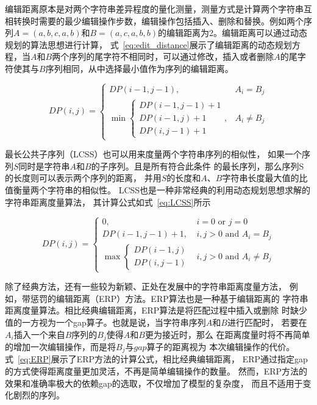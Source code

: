 编辑距离原本是对两个字符串差异程度的量化测量，测量方式是计算两个字符串互相转换时需要的最少编辑操作步数，编辑操作包括插入、删除和替换。例如两个序列$A=\left(a,b,c,a,b\right)$和$B=\left(a,c,a,b,b\right)$的编辑距离为2。编辑距离可以通过动态规划的算法思想进行计算，
式~\ref{eq:edit_distance}展示了编辑距离的动态规划方程，当$A$和$B$两个序列的尾字符不相同时，可以通过修改，插入或者删除$A$的尾字符使其与$B$序列相同，从中选择最小值作为序列的编辑距离。


\begin{equation}
  DP(i, j)= \begin{cases}DP(i-1, j-1), & A_{i}=B_{j} \\
    \min \left\{\begin{array}{c}
    D P(i-1, j-1)+1 \\
    D P(i-1, j)+1 \\
    D P(i, j-1)+1
    \end{array}\right. , & A_{i} \neq B_{j}
  \end{cases}
  \label{eq:edit_distance}
\end{equation}

最长公共子序列（LCSS）也可以用来度量两个字符串序列的相似性，
如果一个序列$S$同时是字符串$A$和$B$的子序列。且是所有符合此条件
的最长序列，那么序列S的长度则可以表示两个序列的距离，
并用$S$的长度和$A$、$B$字符串长度最大值的比值衡量两个字符串的相似性。
LCSS也是一种非常经典的利用动态规划思想求解的字符串距离度量算法，
其计算公式如式~\ref{eq:LCSS}所示

\begin{equation}
  D P(i, j)= \begin{cases}0, & i=0 \text { or } j=0 \\ D P(i-1, j-1)+1, & i, j>0 \text { and } A_{i}=B_{j} \\ \max \begin{cases}D P(i-1, j) \\ D P(i, j-1)\end{cases} & i, j>0 \text { and } A_{i} \neq B_{j}\end{cases}
  \label{eq:LCSS}
\end{equation}

除了经典方法，还有一些较为新颖、正处在发展中的字符串距离度量方法，
例如，带惩罚的编辑距离（ERP）方法。ERP算法也是一种基于编辑距离的
字符串距离度量算法。相比经典编辑距离，ERP算法是将匹配过程中插入或删除
时缺少值的一方视为一个gap算子。也就是说，当字符串序列$A$和$B$进行匹配时，
若要在$A_i$插入一个来自$B$序列的$B_j$使得$A$和$B$更为接近时，那么
在距离度量时将不再简单的增加一次编辑操作，而是将$B_j$与$gap$算子的距离视为
本次编辑操作的代价。式~\ref{eq:ERP}展示了ERP方法的计算公式，相比经典编辑距离，
ERP通过指定gap的方式使得距离度量更加灵活，不再是简单编辑操作的数量。
然而，ERP方法的效果和准确率极大的依赖gap的选取，不仅增加了模型的复杂度，
而且不适用于变化剧烈的序列。

